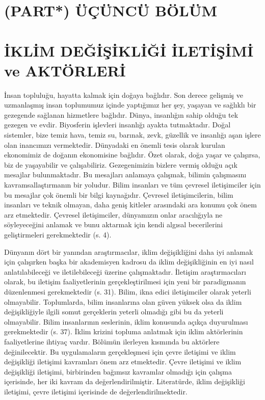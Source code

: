 \documentclass[
]{book}
\begin{document}
\hypertarget{part-uxfcuxe7uxfcncuxfc-buxf6luxfcm}{%
\chapter{(PART*) ÜÇÜNCÜ BÖLÜM}\label{part-uxfcuxe7uxfcncuxfc-buxf6luxfcm}}

\hypertarget{iklim-deux11fiux15fikliux11fi-iletiux15fimi-ve-aktuxf6rleri}{%
\chapter{İKLİM DEĞİŞİKLİĞİ İLETİŞİMİ ve AKTÖRLERİ}\label{iklim-deux11fiux15fikliux11fi-iletiux15fimi-ve-aktuxf6rleri}}

İnsan topluluğu, hayatta kalmak için doğaya bağlıdır. Son derece gelişmiş ve uzmanlaşmış insan toplumumuz içinde yaptığımız her şey, yaşayan ve sağlıklı bir gezegende sağlanan hizmetlere bağlıdır. Dünya, insanlığın sahip olduğu tek gezegen ve evdir. Biyosferin işlevleri insanlığı ayakta tutmaktadır. Doğal sistemler, bize temiz hava, temiz su, barınak, zevk, güzellik ve insanlığı aşan işlere olan inancımızı vermektedir. Dünyadaki en önemli tesis olarak kurulan ekonomimiz de doğanın ekonomisine bağlıdır. Özet olarak, doğa yaşar ve çalışırsa, biz de yaşayabilir ve çalışabiliriz. Gezegenimizin bizlere vermiş olduğu açık mesajlar bulunmaktadır. Bu mesajları anlamaya çalışmak, bilimin çalışmasını kavramsallaştırmanın bir yoludur. Bilim insanları ve tüm çevresel iletişimciler için bu mesajlar çok önemli bir bilgi kaynağıdır. Çevresel iletişimcilerin, bilim insanları ve teknik olmayan, daha geniş kitleler arasındaki ara konumu çok önem arz etmektedir. Çevresel iletişimciler, dünyamızın onlar aracılığıyla ne söyleyeceğini anlamak ve bunu aktarmak için kendi algısal becerilerini geliştirmeleri gerekmektedir (s. 4). \citep{jurin2010environmental}

Dünyanın dört bir yanından araştırmacılar, iklim değişikliğini daha iyi anlamak için çalışırken başka bir akademisyen kadrosu da iklim değişikliğinin en iyi nasıl anlatılabileceği ve iletilebileceği üzerine çalışmaktadır. İletişim araştırmacıları olarak, bu iletişim faaliyetlerinin gerçekleştirilmesi için yeni bir paradigmanın düzenlenmesi gerekmektedir (s. 31). \citep{hansen2016communicating} Bilim, ikna edici iletişimciler olarak yeterli olmayabilir. Toplumlarda, bilim insanlarına olan güven yüksek olsa da iklim değişikliğiyle ilgili somut gerçeklerin yeterli olmadığı gibi bu da yeterli olmayabilir. Bilim insanlarının seslerinin, iklim konusunda açıkça duyurulması gerekmektedir (s. 37). \citep{hansen2016communicating} İklim krizini topluma anlatmak için iklim aktörlerinin faaliyetlerine ihtiyaç vardır. Bölümün ilerleyen kısmında bu aktörlere değinilecektir. Bu uygulamaların gerçekleşmesi için çevre iletişimi ve iklim değişikliği iletişimi kavramları önem arz etmektedir. Çevre iletişimi ve iklim değişikliği iletişimi, birbirinden bağımsız kavramlar olmadığı için çalışma içerisinde, her iki kavram da değerlendirilmiştir. Literatürde, iklim değişikliği iletişimi, çevre iletişimi içerisinde de değerlendirilmektedir.
\end{document}
